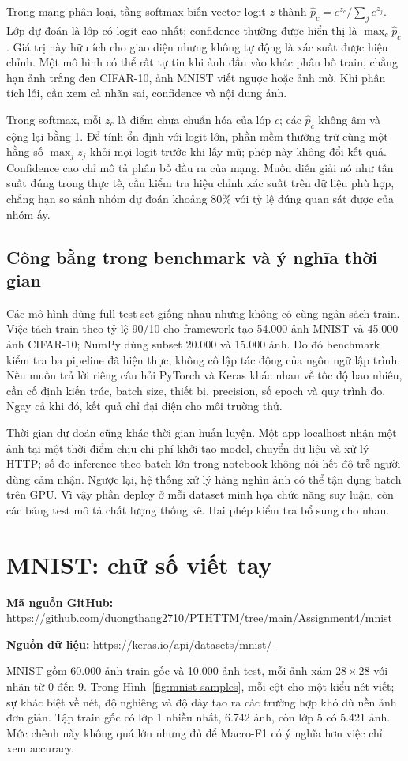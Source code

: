 \documentclass[12pt,a4paper]{report}
\newcommand{\datasetlink}[1]{\par\noindent\textbf{Nguồn dữ liệu: }\url{#1}\par}
\begin{document}
Trong mạng phân loại, tầng softmax biến vector logit $z$ thành $\hat p_c=e^{z_c}/\sum_j e^{z_j}$. Lớp dự đoán là lớp có logit cao nhất; confidence thường được hiển thị là $\max_c\hat p_c$. Giá trị này hữu ích cho giao diện nhưng không tự động là xác suất được hiệu chỉnh. Một mô hình có thể rất tự tin khi ảnh đầu vào khác phân bố train, chẳng hạn ảnh trắng đen CIFAR-10, ảnh MNIST viết ngược hoặc ảnh mờ. Khi phân tích lỗi, cần xem cả nhãn sai, confidence và nội dung ảnh.

Trong softmax, mỗi $z_c$ là điểm chưa chuẩn hóa của lớp $c$; các $\hat p_c$ không âm và cộng lại bằng 1. Để tính ổn định với logit lớn, phần mềm thường trừ cùng một hằng số $\max_j z_j$ khỏi mọi logit trước khi lấy mũ; phép này không đổi kết quả. Confidence cao chỉ mô tả phân bố đầu ra của mạng. Muốn diễn giải nó như tần suất đúng trong thực tế, cần kiểm tra hiệu chỉnh xác suất trên dữ liệu phù hợp, chẳng hạn so sánh nhóm dự đoán khoảng 80\% với tỷ lệ đúng quan sát được của nhóm ấy.

\subsection{Công bằng trong benchmark và ý nghĩa thời gian}
Các mô hình dùng full test set giống nhau nhưng không có cùng ngân sách train. Việc tách train theo tỷ lệ 90/10 cho framework tạo 54.000 ảnh MNIST và 45.000 ảnh CIFAR-10; NumPy dùng subset 20.000 và 15.000 ảnh. Do đó benchmark kiểm tra ba pipeline đã hiện thực, không cô lập tác động của ngôn ngữ lập trình. Nếu muốn trả lời riêng câu hỏi PyTorch và Keras khác nhau về tốc độ bao nhiêu, cần cố định kiến trúc, batch size, thiết bị, precision, số epoch và quy trình đo. Ngay cả khi đó, kết quả chỉ đại diện cho môi trường thử.

Thời gian dự đoán cũng khác thời gian huấn luyện. Một app localhost nhận một ảnh tại một thời điểm chịu chi phí khởi tạo model, chuyển dữ liệu và xử lý HTTP; số đo inference theo batch lớn trong notebook không nói hết độ trễ người dùng cảm nhận. Ngược lại, hệ thống xử lý hàng nghìn ảnh có thể tận dụng batch trên GPU. Vì vậy phần deploy ở mỗi dataset minh họa chức năng suy luận, còn các bảng test mô tả chất lượng thống kê. Hai phép kiểm tra bổ sung cho nhau.

\section{MNIST: chữ số viết tay}
\noindent\textbf{Mã nguồn GitHub: }\url{https://github.com/duongthang2710/PTHTTM/tree/main/Assignment4/mnist}\par
\datasetlink{https://keras.io/api/datasets/mnist/}
MNIST gồm 60.000 ảnh train gốc và 10.000 ảnh test, mỗi ảnh xám $28\times28$ với nhãn từ 0 đến 9. Trong Hình~\ref{fig:mnist-samples}, mỗi cột cho một kiểu nét viết; sự khác biệt về nét, độ nghiêng và độ dày tạo ra các trường hợp khó dù nền ảnh đơn giản. Tập train gốc có lớp 1 nhiều nhất, 6.742 ảnh, còn lớp 5 có 5.421 ảnh. Mức chênh này không quá lớn nhưng đủ để Macro-F1 có ý nghĩa hơn việc chỉ xem accuracy.
\end{document}
